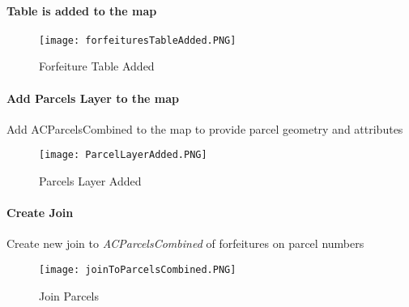 \paragraph*{Table is added to the map}
\begin{figure}[h!]
\centering
    \texttt{[image: forfeituresTableAdded.PNG]}
\caption{Forfeiture Table Added}
\end{figure}
\clearpage
\paragraph{Add Parcels Layer to the map}
\vspace{.3in}

Add ACParcelsCombined to the map to provide parcel geometry and attributes
\vspace{.25in}

\begin{figure}[h!]
\centering
    \texttt{[image: ParcelLayerAdded.PNG]}
\caption{Parcels Layer Added}
\end{figure}
\clearpage
\paragraph{Create Join}
\vspace{.3in}

Create new join to \emph{ACParcelsCombined} of forfeitures on parcel numbers
\vspace{.25in}

\begin{figure}[h!]
\centering
    \texttt{[image: joinToParcelsCombined.PNG]}
\caption{Join Parcels}
\end{figure}
\clearpage
